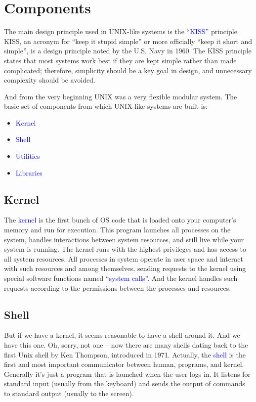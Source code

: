 \documentclass[12pt]{report}
\newcommand{\struct}[1]{\textcolor{blue}{#1}}
\begin{document}
\section*{Components}

The main design principle used in UNIX-like systems is the ``\struct{KISS}''
principle. KISS, an acronym for ``keep it stupid simple'' or more officially
``keep it short and simple'', is a design principle noted by the U.S. Navy
in 1960. The KISS principle states that most systems work best if they are kept
simple rather than made complicated; therefore, simplicity should be
a key goal in design, and unnecessary complexity should be avoided.

\medskip
And from the very beginning UNIX was a very flexible modular system.
The basic set of components from which UNIX-like systems are built is:
\begin{itemize}
\item \struct{Kernel}
\item \struct{Shell}
\item \struct{Utilities}
\item \struct{Libraries}
\end{itemize}

\subsection*{Kernel}

The \struct{kernel} is the first bunch of OS code that is loaded onto your
computer's memory and run for execution. This program launches all
processes on the system, handles interactions between system resources,
and still live while your system is running. The kernel runs with
the highest privileges and has access to all system resources. All processes
in system operate in user space and interact with such resources and
among themselves, sending requests to the kernel using special software
functions named ``\struct{system calls}''. And the kernel handles such requests
according to the permissions between the processes and resources.

\subsection*{Shell}

But if we have a kernel, it seems reasonable to have a shell around it.
And we have this one. Oh, sorry, not one -- now there are many shells
dating back to the first Unix shell by Ken Thompson, introduced in 1971.
Actually, the \struct{shell} is the first and most important communicator between
human, programs, and kernel. Generally it's just a program that is
launched when the user logs in. It listens for standard input (usually
from the keyboard) and sends the output of commands to standard output
(usually to the screen).
\end{document}

